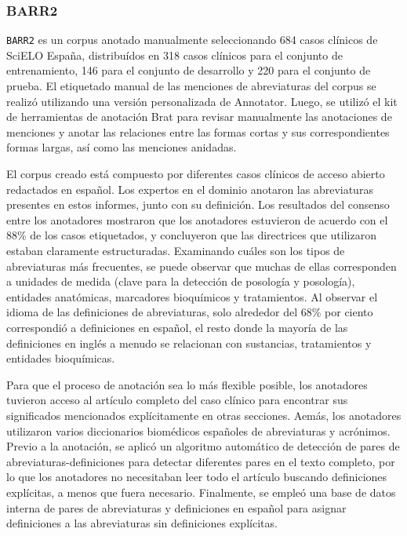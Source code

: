 \subsubsection*{BARR2}

\texttt{BARR2} es un corpus anotado manualmente seleccionando 684 casos clínicos de SciELO España, distribuídos en 318 casos clínicos para el conjunto de entrenamiento, 146 para el conjunto de desarrollo y 220 para el conjunto de prueba.
El etiquetado manual de las menciones de abreviaturas del corpus se realizó utilizando una versión personalizada de Annotator.
Luego, se utilizó el kit de herramientas de anotación Brat para revisar manualmente las anotaciones de menciones y anotar las relaciones entre las formas cortas y sus correspondientes formas largas, así como las menciones anidadas.

El corpus creado está compuesto por diferentes casos clínicos de acceso abierto redactados en español.
Los expertos en el dominio anotaron las abreviaturas presentes en estos informes, junto con su definición.
Los resultados del consenso entre los anotadores mostraron que los anotadores estuvieron de acuerdo con el 88\% de los casos etiquetados, y concluyeron que las directrices que utilizaron estaban claramente estructuradas.
Examinando cuáles son los tipos de abreviaturas más frecuentes, se puede observar que muchas de ellas corresponden a unidades de medida (clave para la detección de posología y posología), entidades anatómicas, marcadores bioquímicos y tratamientos.
Al observar el idioma de las definiciones de abreviaturas, solo alrededor del 68\% por ciento correspondió a definiciones en español, el resto donde la mayoría de las definiciones en inglés a menudo se relacionan con sustancias, tratamientos y entidades bioquímicas.

Para que el proceso de anotación sea lo más flexible posible, los anotadores tuvieron acceso al artículo completo del caso clínico para encontrar sus significados mencionados explícitamente en otras secciones.
Aemás, los anotadores utilizaron varios diccionarios biomédicos españoles de abreviaturas y acrónimos.
Previo a la anotación, se aplicó un algoritmo automático de detección de pares de abreviaturas-definiciones para detectar diferentes pares en el texto completo, por lo que los anotadores no necesitaban leer todo el artículo buscando definiciones explícitas, a menos que fuera necesario.
Finalmente, se empleó una base de datos interna de pares de abreviaturas y definiciones en español para asignar definiciones a las abreviaturas sin definiciones explícitas.

